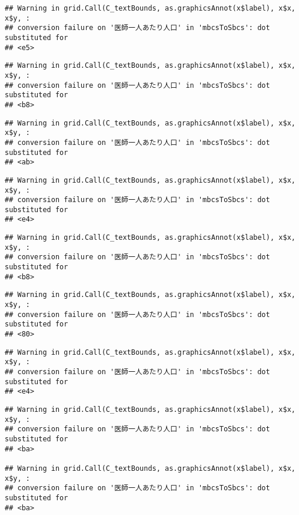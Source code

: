 \documentclass[
]{article}
\begin{document}
\begin{verbatim}
## Warning in grid.Call(C_textBounds, as.graphicsAnnot(x$label), x$x, x$y, :
## conversion failure on '医師一人あたり人口' in 'mbcsToSbcs': dot substituted for
## <e5>
\end{verbatim}

\begin{verbatim}
## Warning in grid.Call(C_textBounds, as.graphicsAnnot(x$label), x$x, x$y, :
## conversion failure on '医師一人あたり人口' in 'mbcsToSbcs': dot substituted for
## <b8>
\end{verbatim}

\begin{verbatim}
## Warning in grid.Call(C_textBounds, as.graphicsAnnot(x$label), x$x, x$y, :
## conversion failure on '医師一人あたり人口' in 'mbcsToSbcs': dot substituted for
## <ab>
\end{verbatim}

\begin{verbatim}
## Warning in grid.Call(C_textBounds, as.graphicsAnnot(x$label), x$x, x$y, :
## conversion failure on '医師一人あたり人口' in 'mbcsToSbcs': dot substituted for
## <e4>
\end{verbatim}

\begin{verbatim}
## Warning in grid.Call(C_textBounds, as.graphicsAnnot(x$label), x$x, x$y, :
## conversion failure on '医師一人あたり人口' in 'mbcsToSbcs': dot substituted for
## <b8>
\end{verbatim}

\begin{verbatim}
## Warning in grid.Call(C_textBounds, as.graphicsAnnot(x$label), x$x, x$y, :
## conversion failure on '医師一人あたり人口' in 'mbcsToSbcs': dot substituted for
## <80>
\end{verbatim}

\begin{verbatim}
## Warning in grid.Call(C_textBounds, as.graphicsAnnot(x$label), x$x, x$y, :
## conversion failure on '医師一人あたり人口' in 'mbcsToSbcs': dot substituted for
## <e4>
\end{verbatim}

\begin{verbatim}
## Warning in grid.Call(C_textBounds, as.graphicsAnnot(x$label), x$x, x$y, :
## conversion failure on '医師一人あたり人口' in 'mbcsToSbcs': dot substituted for
## <ba>

## Warning in grid.Call(C_textBounds, as.graphicsAnnot(x$label), x$x, x$y, :
## conversion failure on '医師一人あたり人口' in 'mbcsToSbcs': dot substituted for
## <ba>
\end{verbatim}
\end{document}
